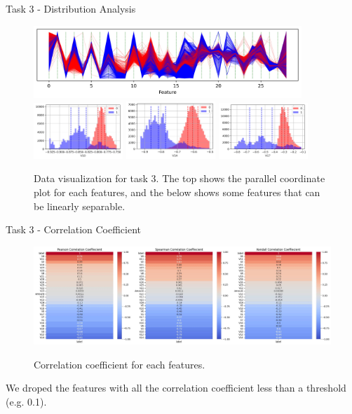 \documentclass{beamer}
\begin{document}
\begin{frame}{Task 3 - Distribution Analysis}

  \begin{figure}[H]
    \centering
    \includegraphics[width=0.9\textwidth]{../code/Task3/Analysis/PC.jpg} \\
    \includegraphics[width=0.3\textwidth]{../code/Task3/Analysis/Hist-9.jpg}
    \includegraphics[width=0.3\textwidth]{../code/Task3/Analysis/Hist-13.jpg}
    \includegraphics[width=0.3\textwidth]{../code/Task3/Analysis/Hist-16.jpg}
    \caption{Data visualization for task 3. The top shows the parallel coordinate plot for each features, and the below shows some features that can be linearly separable.}
  \end{figure}

\end{frame}

\begin{frame}{Task 3 - Correlation Coefficient}

  \begin{figure}[H]
    \centering
    \includegraphics[width=\textwidth]{../code/Task3/Analysis/corrcoef.jpg} \\
    \caption{Correlation coefficient for each features.}
  \end{figure}

  We droped the features with all the correlation coefficient less than a threshold (e.g. 0.1).

\end{frame}
\end{document}
